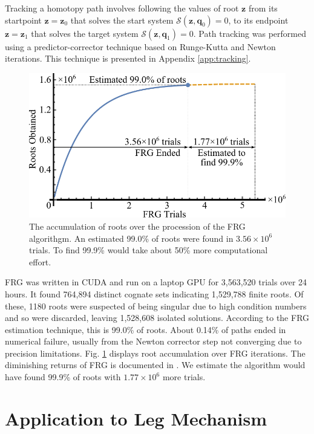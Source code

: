 \documentclass[journal]{IEEEtran}
\begin{document}
Tracking a homotopy path involves following the values of root $\mathbf{z}$ from its startpoint $\mathbf{z} = \mathbf{z}_0$ that solves the start system $\mathcal{S}(\mathbf{z},\mathbf{q}_0)=0$, to its endpoint $\mathbf{z} = \mathbf{z}_1$ that solves the target system $\mathcal{S}(\mathbf{z},\mathbf{q}_1)=0$.
Path tracking was performed using a predictor-corrector technique based on Runge-Kutta and Newton iterations.  
This technique is presented in Appendix \ref{app:tracking}.


\begin{figure}[!b]
\centering
\includegraphics[scale=0.6]{frg_results}
\caption{The accumulation of roots over the procession of the FRG algorithgm.  An estimated 99.0\% of roots were found in $3.56 \times 10^6$ trials.  To find 99.9\% would take about 50\% more computational effort.}
\label{frg_results}
\end{figure}


FRG was written in CUDA and run on a laptop GPU for 3,563,520 trials over 24 hours.
It found 764,894 distinct cognate sets indicating 1,529,788 finite roots.
Of these, 1180 roots were suspected of being singular due to high condition numbers and so were discarded, leaving 1,528,608 isolated solutions.
According to the FRG estimation technique, this is 99.0\% of roots.  About 0.14\% of paths ended in numerical failure, usually from the Newton corrector step not converging due to precision limitations.  Fig. \ref{frg_results} displays root accumulation over FRG iterations.  The diminishing returns of FRG is documented in \cite{plecnikStudyFindingFinite2017}.  We estimate the algorithm would have found 99.9\% of roots with $1.77\times 10^6$ more trials.



\section{Application to Leg Mechanism}
\label{sec:leg_app}
\end{document}
